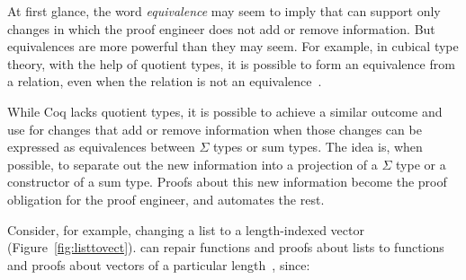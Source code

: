 At first glance, the word \textit{equivalence} may seem to imply that \toolname can support only changes in
which the proof engineer does not add or remove information.
But equivalences are more powerful than they may seem.
For example, in cubical type theory, with the help of quotient types, it is possible to form an equivalence
from a relation, even when the relation is not an equivalence~\cite{angiuli2020internalizing}.

While Coq lacks quotient types,
it is possible to achieve a similar outcome and use \toolname for changes that add or remove information
when those changes can be expressed as equivalences between $\Sigma$ types or sum types.
The idea is, when possible, to separate out the new information
into a projection of a $\Sigma$ type or a constructor of a sum type.
Proofs about this new information become the proof obligation for the proof engineer,
and \toolname automates the rest.

\begin{figure*}
\begin{minipage}{0.40\textwidth}
   
\end{minipage}
\hfill
\begin{minipage}{0.58\textwidth}
   
\end{minipage}
\vspace{-0.3cm}
\caption{A vector (right) is a list (left) indexed by its length.}
\label{fig:listtovect}
\end{figure*}

Consider, for example, changing a list to a length-indexed vector (Figure~\ref{fig:listtovect}).
\toolname can repair functions and proofs about lists to functions and proofs about vectors of a particular length~, %
since:

